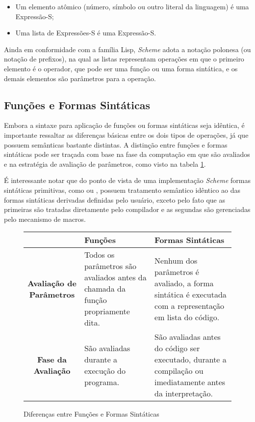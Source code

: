 \begin{itemize}

\item Um elemento atômico (número, símbolo ou outro literal da linguagem) é uma
Expressão-S;

\item Uma lista de Expressões-S é uma Expressão-S.

\end{itemize}

Ainda em conformidade com a família Lisp, \textit{Scheme} adota a notação
polonesa (ou notação de prefixos), na qual as listas representam operações em
que o primeiro elemento é o operador, que pode ser uma função ou uma forma
sintática, e os demais elementos são parâmetros para a operação.

\subsection{Funções e Formas Sintáticas}

Embora a sintaxe para aplicação de funções ou formas sintáticas seja idêntica,
é importante ressaltar as diferenças básicas entre os dois tipos de operações,
já que possuem semânticas bastante distintas. A distinção entre funções e
formas sintáticas pode ser traçada com base na fase da computação em que são
avaliados e na estratégia de avaliação de parâmetros, como visto na tabela
\ref{table:functions-vs-special-forms}.

É interessante notar que do ponto de vista de uma implementação \textit{Scheme}
formas sintáticas primitivas, como  ou , possuem
tratamento semântico idêntico ao das formas sintáticas derivadas definidas pelo
usuário, exceto pelo fato que as primeiras são tratadas diretamente pelo
compilador e as segundas são gerenciadas pelo mecanismo de macros.

\begin{figure}[h!]
 \begin{center}
  \begin{tabular} { | c | p{4cm} | p{4cm} | }
   \hline
                        & \textbf{Funções} & \textbf{Formas Sintáticas} \\ \hline
    \textbf{Avaliação de Parâmetros} & Todos os parâmetros são avaliados antes da chamada da função propriamente dita. & Nenhum dos parâmetros é avaliado, a forma sintática é executada com a representação em lista do código. \\ \hline
    \textbf{Fase da Avaliação} & São avaliadas durante a execução do programa. & São avaliadas antes do código ser executado, durante a compilação ou imediatamente antes da interpretação. \\ \hline
  \end{tabular}
 \end{center}
 \caption{Diferenças entre Funções e Formas Sintáticas} 
 \label{table:functions-vs-special-forms}
\end{figure}

